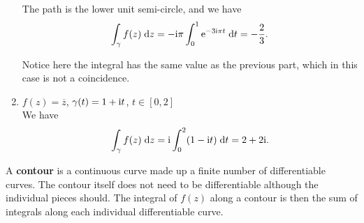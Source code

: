 \documentclass[letter-paper]{tufte-book}
\newenvironment{example}[1][Example]{\begin{trivlist}
\item[\hskip \labelsep {\bfseries #1}]}{\end{trivlist}}
\newcommand{\ex}{\mathrm{e}}
\newcommand{\zi}{{\rm i}}
\newcommand\Def[1]{\textbf{#1}}
\begin{document}
\begin{example}
\begin{enumerate}
    The path is the lower unit semi-circle, and we have
    \begin{equation*}
      \int_\gamma f(z)\; \mathrm{d}z = -\zi \pi \int^1_0 \ex^{-3\zi\pi t}\; \mathrm{d}t = -\frac{2}{3}.
    \end{equation*}
    
    Notice here the integral has the same value as the previous part, which in
    this case is not a coincidence.
    
    \item $f(z) = \overline{z}$, $\gamma(t) = 1 + \zi t$, $t \in [0, 2]$\\
    
    We have
    \begin{equation*}
      \int_\gamma f(z)\; \mathrm{d}z = \zi \int^2_0 (1 - \zi t)\; \mathrm{d}t = 2 + 2\zi.
    \end{equation*}
  \end{enumerate}
\end{example}

A \Def{contour} is a continuous curve made up a finite number of differentiable
curves. The contour itself does not need to be differentiable although the
individual pieces should. The integral of $f(z)$ along a contour is then the sum
of integrals along each individual differentiable curve.
\end{document}
